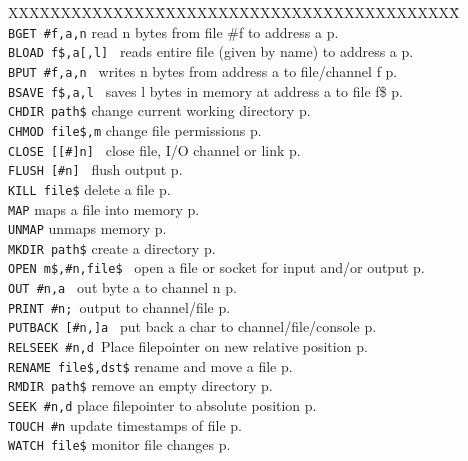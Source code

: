 \begin{tabbing}
XXXXXXXXXXXXXX\=XXXXXXXXXXXXXXXXXXXXXXXXXXXXX\=\kill\\
{\tt BGET \#f,a,n}\> read n bytes from file \#f to address a\> p.\pageref{BGET}\\
{\tt BLOAD f\$,a[,l]	}\> reads entire file (given by name) to address a\> p.\pageref{BLOAD}\\
{\tt BPUT \#f,a,n	}\> writes n bytes from address a to file/channel f\> p.\pageref{BPUT}\\
{\tt BSAVE f\$,a,l	}\> saves l bytes in memory at address a to file f\$\> p.\pageref{BSAVE}\\
\verb|CHDIR path$|       \> change current working directory\> p.\pageref{CHDIR}\\
\verb|CHMOD file$,m|     \> change file permissions \> p.\pageref{CHMOD}\\
{\tt CLOSE  [[\#]n]  }	\> close file, I/O channel or link\> p.\pageref{CLOSE}\\
{\tt FLUSH [\#n]	}\> flush output\> p.\pageref{FLUSH}\\
\verb|KILL file$|       \> delete a file \> p.\pageref{KILL}\\
\verb|MAP|       \> maps a file into memory \> p.\pageref{MAP}\\
\verb|UNMAP|       \> unmaps memory \> p.\pageref{UNMAP}\\
\verb|MKDIR path$|       \> create a directory \> p.\pageref{MKDIR}\\
{\tt OPEN m\$,\#n,file\$ }\>  open a file or socket for input and/or output\> p.\pageref{OPEN}\\
{\tt OUT \#n,a		}\> out byte a to channel n\> p.\pageref{OUT}\\
{\tt PRINT \#n;		}\>output to channel/file      \> p.\pageref{PRINT}\\
{\tt PUTBACK [\#n,]a 	}\> put back a char to channel/file/console\> p.\pageref{PUTBACK}\\
{\tt RELSEEK \#n,d	}\>Place filepointer on new relative position\> p.\pageref{RELSEEK}\\
\verb|RENAME file$,dst$| \> rename and move a file     \> p.\pageref{RENAME}\\
\verb|RMDIR path$|       \> remove an empty directory  \> p.\pageref{RMDIR}\\
\verb|SEEK #n,d|	 \> place filepointer to absolute position\> p.\pageref{SEEK}\\
\verb|TOUCH #n| 	 \> update timestamps of file  \> p.\pageref{TOUCH}\\
\verb|WATCH file$|       \> monitor file changes       \> p.\pageref{WATCH}\\
\end{tabbing}


